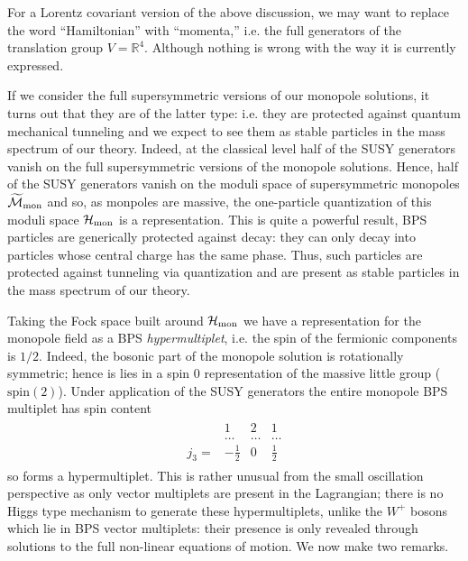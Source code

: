 \documentclass[12pt, onecolumn]{article}
\newenvironment{remark}[1][Remark]{\begin{trivlist}
\item[\hskip \labelsep {\bfseries #1}]}{\end{trivlist}}
\begin{document}
\begin{remark}
For a Lorentz covariant version of the above discussion, we may want to replace the word ``Hamiltonian'' with ``momenta,'' i.e. the full generators of the translation group $V=\mathbb{R}^{4}$.  Although nothing is wrong with the way it is currently expressed.
\end{remark}

\noindent If we consider the full supersymmetric versions of our monopole solutions, it turns out that they are of the latter type: i.e. they are protected against quantum mechanical tunneling and we expect to see them as stable particles in the mass spectrum of our theory. Indeed, at the classical level half of the SUSY generators vanish on the full supersymmetric versions of the monopole solutions.  Hence, half of the SUSY generators vanish on the moduli space of supersymmetric monopoles $\widetilde{\cal M}_{\text{mon}}$ and so, as monpoles are massive, the one-particle quantization of this moduli space ${\cal H}_{\text{mon}}$ is a  representation.  This is quite a powerful result, BPS particles are generically protected against decay: they can only decay into particles whose central charge has the same phase.  Thus, such particles are protected against tunneling via quantization and are present as stable particles in the mass spectrum of our theory.

\vspace{5mm}

\noindent Taking the Fock space built around ${\cal H}_{\text{mon}}$ we have a representation for the monopole field as a BPS \textit{hypermultiplet}, i.e. the spin of the fermionic components is $1/2$.  Indeed, the bosonic part of the monopole solution is rotationally symmetric; hence is lies in a spin 0 representation of the massive little group ($\text{spin}(2)$).  Under application of the SUSY generators the entire monopole BPS multiplet has spin content
\begin{align*}
\begin{array}{cccc}
{} & 1 & 2 & 1\\
{} & \ldots & \ldots & \ldots\\
j_{3}= & -\frac{1}{2} & 0 & \frac{1}{2}
\end{array}
\end{align*}
so forms a hypermultiplet.  This is rather unusual from the small oscillation perspective as only vector multiplets are present in the Lagrangian; there is no Higgs type mechanism to generate these hypermultiplets, unlike the $W^{+}$ bosons which lie in BPS vector multiplets: their presence is only revealed through solutions to the full non-linear equations of motion.  We now make two remarks.
\end{document}
